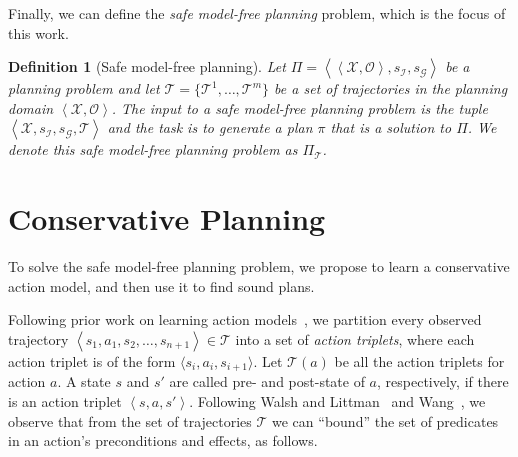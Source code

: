 \documentclass{article}
\newtheorem{definition}{Definition}
\newcommand{\tuple}[1]{\ensuremath{\left \langle #1 \right \rangle }}
\begin{document}
	Finally, we can define the {\em safe model-free planning} problem, which is the focus of this work. 
	
	\begin{definition}[Safe model-free planning]
		Let $\Pi=\tuple{\tuple{\mathcal{X},\mathcal{O}},s_\mathcal{I}, s_\mathcal{G}}$ be a planning 
		problem and let $\mathcal{T}=\{\mathcal{T}^1,\ldots,\mathcal{T}^m\}$ be a set of trajectories in 
		the planning domain $\tuple{\mathcal{X},\mathcal{O}}$. 
		The input to a safe model-free planning problem is 
		the tuple $\tuple{\mathcal{X},s_\mathcal{I}, s_\mathcal{G}, \mathcal{T}}$
		and the task is to generate a plan $\pi$  that is a solution to $\Pi$. 
		We denote this safe model-free planning problem as $\Pi_\mathcal{T}$. 
		\label{def:model-free-planning}
	\end{definition}
	
	
	
	
	\section{Conservative Planning}
	To solve the safe model-free planning problem, we propose to learn a conservative action model, and then use it to find sound plans.
	
	Following prior work on learning action models~\cite{wang1995learning,wang1994learning,walsh2008efficientLearning}, we partition every observed trajectory $\tuple{s_1,a_1,s_2,\ldots,s_{n+1}}\in\mathcal{T}$ into a set of {\em action triplets}, where each action triplet is of the form $\langle s_i, a_i, s_{i+1}\rangle$. 
	Let $\mathcal{T}(a)$ be all the action triplets for action $a$. 
	A state $s$ and $s'$ are called pre- and post-state of $a$, respectively, if there is an action triplet $\tuple{s,a,s'}$. Following Walsh and Littman~ and Wang~, we observe that from the set of trajectories $\mathcal{T}$ we can ``bound'' the set of predicates in an action's preconditions and effects, as follows. 
	
\end{document}
